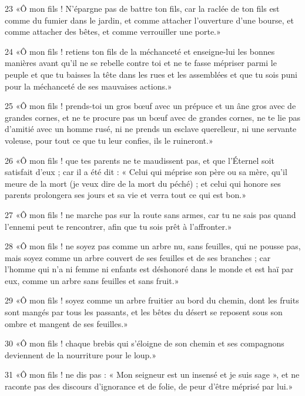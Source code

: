 \par 23 «Ô mon fils ! N'épargne pas de battre ton fils, car la raclée de ton fils est comme du fumier dans le jardin, et comme attacher l'ouverture d'une bourse, et comme attacher des bêtes, et comme verrouiller une porte.»

\par 24 «Ô mon fils ! retiens ton fils de la méchanceté et enseigne-lui les bonnes manières avant qu'il ne se rebelle contre toi et ne te fasse mépriser parmi le peuple et que tu baisses la tête dans les rues et les assemblées et que tu sois puni pour la méchanceté de ses mauvaises actions.»

\par 25 «Ô mon fils ! prends-toi un gros bœuf avec un prépuce et un âne gros avec de grandes cornes, et ne te procure pas un bœuf avec de grandes cornes, ne te lie pas d'amitié avec un homme rusé, ni ne prends un esclave querelleur, ni une servante voleuse, pour tout ce que tu leur confies, ils le ruineront.»

\par 26 «Ô mon fils ! que tes parents ne te maudissent pas, et que l'Éternel soit satisfait d'eux ; car il a été dit : « Celui qui méprise son père ou sa mère, qu'il meure de la mort (je veux dire de la mort du péché) ; et celui qui honore ses parents prolongera ses jours et sa vie et verra tout ce qui est bon.»

\par 27 «Ô mon fils ! ne marche pas sur la route sans armes, car tu ne sais pas quand l'ennemi peut te rencontrer, afin que tu sois prêt à l'affronter.»

\par 28 «Ô mon fils ! ne soyez pas comme un arbre nu, sans feuilles, qui ne pousse pas, mais soyez comme un arbre couvert de ses feuilles et de ses branches ; car l'homme qui n'a ni femme ni enfants est déshonoré dans le monde et est haï par eux, comme un arbre sans feuilles et sans fruit.»

\par 29 «Ô mon fils ! soyez comme un arbre fruitier au bord du chemin, dont les fruits sont mangés par tous les passants, et les bêtes du désert se reposent sous son ombre et mangent de ses feuilles.»

\par 30 «Ô mon fils ! chaque brebis qui s'éloigne de son chemin et ses compagnons deviennent de la nourriture pour le loup.»

\par 31 «Ô mon fils ! ne dis pas : « Mon seigneur est un insensé et je suis sage », et ne raconte pas des discours d'ignorance et de folie, de peur d'être méprisé par lui.»


